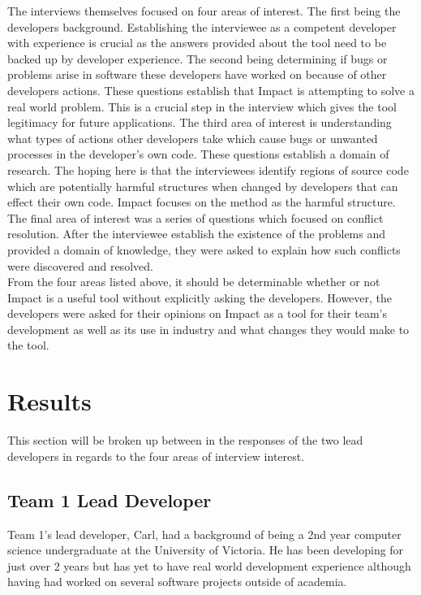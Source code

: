 \documentclass[conference]{IEEEtran}
\begin{document}
The interviews themselves focused on four areas of interest. The first being the developers background.
Establishing the interviewee as a competent developer with experience is crucial as the answers
provided about the tool need to be backed up by developer experience.  The second being determining
if bugs or problems arise in software these developers have worked on because of other developers
actions. These questions establish that Impact is attempting to solve a real world problem. This
is a crucial step in the interview which gives the tool legitimacy for future applications. The third
area of interest is understanding what types of actions other developers take which cause bugs
or unwanted processes in the developer's own code. These questions establish a domain of 
research. The hoping here is that the interviewees identify regions of source code which are
potentially harmful structures when changed by developers that can effect their own code. Impact
focuses on the method as the harmful structure. The final area of interest was a series of questions
which focused on conflict resolution. After the interviewee establish the existence of the problems
and provided a domain of knowledge, they were asked to explain how such conflicts were
discovered and resolved. \\

From the four areas listed above, it should be determinable whether or not Impact is a useful tool
without explicitly asking the developers. However, the developers were asked for their opinions 
on Impact as a tool for their team's development as well as its use in industry and what changes
they would make to the tool. \\

\section{Results}
This section will be broken up between in the responses of the two lead developers in regards to
the four areas of interview interest.

\subsection{Team 1 Lead Developer}
Team 1's lead developer, Carl, had a background of being a 2nd year computer science undergraduate
at the University of Victoria. He has been developing for just over 2 years but has yet to have real world
development experience although having had worked on several software projects outside of academia. \\
\end{document}
